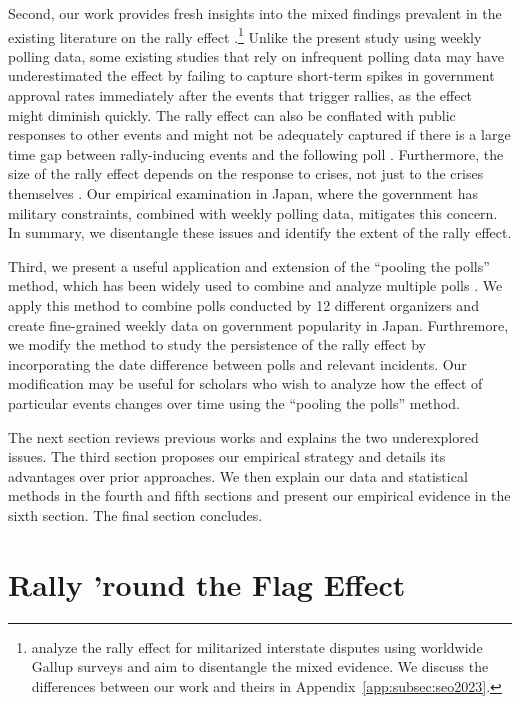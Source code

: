 \documentclass[letterpaper,12pt]{scrartcl}
\begin{document}
Second, our work provides fresh insights into the mixed findings prevalent in the existing literature on the rally effect \citep{newport2021}.\footnote{\citet{seo2023} analyze the rally effect for militarized interstate disputes using worldwide Gallup surveys and aim to disentangle the mixed evidence. We discuss the differences between our work and theirs in Appendix~\ref{app:subsec:seo2023}.} Unlike the present study using weekly polling data, some existing studies that rely on infrequent polling data may have underestimated the effect by failing to capture short-term spikes in government approval rates immediately after the events that trigger rallies, as the effect might diminish quickly. The rally effect can also be conflated with public responses to other events and might not be adequately captured if there is a large time gap between rally-inducing events and the following poll \citep{Oneal1995PolitBehav}. Furthermore, the size of the rally effect depends on the response to crises, not just to the crises themselves \citep{James1998PRQ}. Our empirical examination in Japan, where the government has military constraints, combined with weekly polling data, mitigates this concern. In summary, we disentangle these issues and identify the extent of the rally effect.

Third, we present a useful application and extension of the ``pooling the polls'' method, which has been widely used to combine and analyze multiple polls \citep{Jackman2005AustJPolitSci}. We apply this method to combine polls conducted by 12 different organizers and create fine-grained weekly data on government popularity in Japan. Furthremore, we modify the method to study the persistence of the rally effect by incorporating the date difference between polls and relevant incidents. Our modification may be useful for scholars who wish to analyze how the effect of particular events changes over time using the ``pooling the polls'' method.

The next section reviews previous works and explains the two underexplored issues. The third section proposes our empirical strategy and details its advantages over prior approaches. We then explain our data and statistical methods in the fourth and fifth sections and present our empirical evidence in the sixth section. The final section concludes.

\section*{Rally 'round the Flag Effect\centering}
\end{document}
